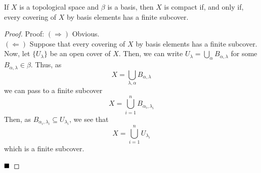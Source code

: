 \begin{lemma}
    If $X$ is a topological space and $\beta$ is a basis, then $X$ is compact if, and only if, every covering of $X$ by basis elements has a finite subcover. 
\end{lemma}
\begin{proof}{Proof:}
    $(\Rightarrow)$ Obvious.\\

    $(\Leftarrow)$ Suppose that every covering of $X$ by basis elements has a finite subcover. Now, let $\{U_{\lambda}\}$ be an open cover of $X$. Then, we can write $U_{\lambda} = \bigcup_{\alpha} B_{\alpha, \lambda}$ for some $B_{\alpha, \lambda} \in \beta$. Thus, as
    \[ X = \bigcup_{\lambda, \alpha} B_{\alpha, \lambda} \]
    we can pass to a finite subcover
    \[ X = \bigcup_{i = 1}^{n} B_{\alpha_i, \lambda_i} \]
    Then, as $B_{\alpha_i, \lambda_i} \subseteq U_{\lambda_i}$, we see that
    \[ X = \bigcup_{i = 1}^{n} U_{\lambda_i} \]
    which is a finite subcover.

    $\qed$
\end{proof}